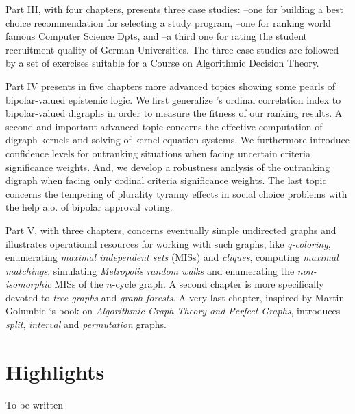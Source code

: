 Part III, with four chapters, presents three case studies: --one for building a best choice recommendation for selecting a study program, --one for ranking world famous Computer Science Dpts, and --a third one for rating the student recruitment quality of German Universities. The three case studies are followed by a set of exercises suitable for a Course on Algorithmic Decision Theory.

Part IV presents in five chapters more advanced topics showing some pearls of bipolar-valued epistemic logic. We first generalize \Kendall 's ordinal correlation index to bipolar-valued digraphs in order to measure the fitness of our ranking results. A second and important advanced topic concerns the effective computation of digraph kernels and solving of \Berge kernel equation systems. We furthermore introduce confidence levels for outranking situations when facing uncertain criteria significance weights. And, we develop a robustness analysis of the outranking digraph when facing only ordinal criteria significance weights. The last topic concerns the tempering of plurality tyranny effects in social choice problems with the help a.o. of bipolar approval voting. 

Part V, with three chapters, concerns eventually simple undirected graphs and illustrates operational resources for working with such graphs, like \emph{q-coloring}, enumerating\emph{ maximal independent sets} (MISs) and \emph{cliques}, computing \emph{maximal matchings}, simulating \emph{Metropolis random walks} and enumerating the \emph{non-isomorphic} MISs of the $n$-cycle graph. A second chapter is more specifically devoted to \emph{tree graphs} and \emph{graph forests}. A very last chapter, inspired by Martin Golumbic ‘s book on \emph{Algorithmic Graph Theory and Perfect Graphs}, introduces \emph{split}, \emph{interval} and \emph{permutation} graphs.

\section{Highlights}

To be written

\clearpage



